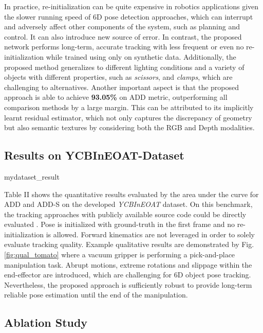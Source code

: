 \documentclass[letterpaper, 10 pt, conference]{ieeeconf}
\begin{document}
In practice, re-initialization can be quite expensive in robotics applications given the slower running speed of 6D pose detection approaches, which can interrupt and adversely affect other components of the system, such as planning and control. It can also introduce new source of error. In contrast, the proposed network performs long-term, accurate tracking with less frequent or even no re-initialization while trained using only on synthetic data. Additionally, the proposed method generalizes to different lighting conditions and a variety of objects with different properties, such as {\it scissors}, and {\it clamps}, which are challenging to alternatives. Another important aspect is that the proposed approach is able to achieve {\bf 93.05\%} on ADD metric, outperforming all comparison methods by a large margin. This can be attributed to its implicitly learnt residual estimator, which not only captures the discrepancy of geometry but also semantic textures by considering both the RGB and Depth modalities. 

\subsection{Results on YCBInEOAT-Dataset}
{mydataset_result}

Table II shows the quantitative results evaluated by the area under the curve for ADD and ADD-S on the developed {\it YCBInEOAT} dataset. On this benchmark, the tracking approaches with publicly available source code could be directly evaluated \cite{Wthrich2013ProbabilisticOT,issac2016depth}. Pose is initialized with ground-truth in the first frame and no re-initialization is allowed. Forward kinematics are not leveraged in order to solely evaluate tracking quality. Example qualitative results are demonstrated by Fig. \ref{fig:qual_tomato} where a vacuum gripper is performing a pick-and-place manipulation task. Abrupt motions, extreme rotations and slippage within the end-effector are introduced, which are challenging for 6D object pose tracking. Nevertheless, the proposed approach is sufficiently robust to provide long-term reliable pose estimation until the end of the manipulation.

\label{sec:ablation}
\subsection{Ablation Study}
\end{document}
